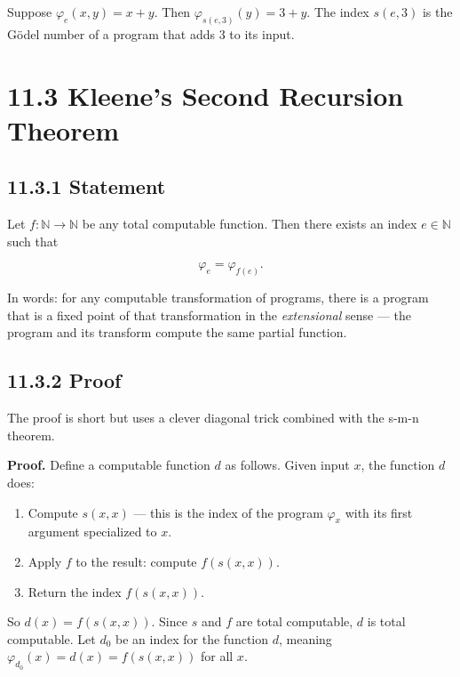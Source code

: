 \begin{example}
Suppose $\varphi_e(x, y) = x + y$. Then $\varphi_{s(e, 3)}(y) = 3 + y$. The index $s(e, 3)$ is the Gödel number of a program that adds 3 to its input.
\end{example}

\section{11.3 Kleene's Second Recursion Theorem}

\subsection{11.3.1 Statement}

\begin{theorem}
Let $f: \mathbb{N} \to \mathbb{N}$ be any total computable function. Then there exists an index $e \in \mathbb{N}$ such that

\[
\varphi_e = \varphi_{f(e)}.
\]

In words: for any computable transformation of programs, there is a program that is a fixed point of that transformation in the \textit{extensional} sense --- the program and its transform compute the same partial function.
\end{theorem}

\subsection{11.3.2 Proof}

The proof is short but uses a clever diagonal trick combined with the s-m-n theorem.

\textbf{Proof.} Define a computable function $d$ as follows. Given input $x$, the function $d$ does:

\begin{enumerate}
  \item Compute $s(x, x)$ --- this is the index of the program $\varphi_x$ with its first argument specialized to $x$.
  \item Apply $f$ to the result: compute $f(s(x, x))$.
  \item Return the index $f(s(x, x))$.
\end{enumerate}

So $d(x) = f(s(x, x))$. Since $s$ and $f$ are total computable, $d$ is total computable. Let $d_0$ be an index for the function $d$, meaning $\varphi_{d_0}(x) = d(x) = f(s(x, x))$ for all $x$.

